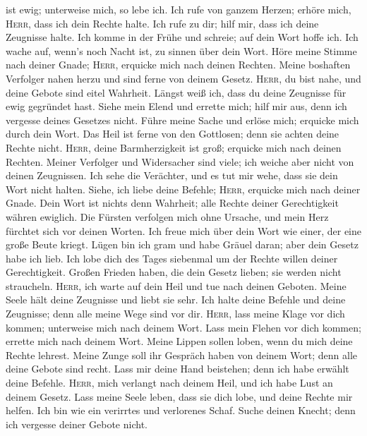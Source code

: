 ist ewig; unterweise mich, so lebe ich.  Ich rufe von
ganzem Herzen; erhöre mich, \textsc{Herr}, dass ich dein Rechte halte.
 Ich rufe zu dir; hilf mir, dass ich deine Zeugnisse
halte.  Ich komme in der Frühe und schreie; auf dein
Wort hoffe ich.  Ich wache auf, wenn's noch Nacht ist,
zu sinnen über dein Wort.  Höre meine Stimme nach deiner
Gnade; \textsc{Herr}, erquicke mich nach deinen Rechten.
 Meine boshaften Verfolger nahen herzu und sind ferne
von deinem Gesetz.  \textsc{Herr}, du bist nahe, und
deine Gebote sind eitel Wahrheit.  Längst weiß ich, dass
du deine Zeugnisse für ewig gegründet hast.  Siehe mein
Elend und errette mich; hilf mir aus, denn ich vergesse deines Gesetzes
nicht.  Führe meine Sache und erlöse mich; erquicke mich
durch dein Wort.  Das Heil ist ferne von den Gottlosen;
denn sie achten deine Rechte nicht.  \textsc{Herr},
deine Barmherzigkeit ist groß; erquicke mich nach deinen Rechten.
 Meiner Verfolger und Widersacher sind viele; ich weiche
aber nicht von deinen Zeugnissen.  Ich sehe die
Verächter, und es tut mir wehe, dass sie dein Wort nicht halten.
 Siehe, ich liebe deine Befehle; \textsc{Herr}, erquicke
mich nach deiner Gnade.  Dein Wort ist nichts denn
Wahrheit; alle Rechte deiner Gerechtigkeit währen ewiglich.
 Die Fürsten verfolgen mich ohne Ursache, und mein Herz
fürchtet sich vor deinen Worten.  Ich freue mich über
dein Wort wie einer, der eine große Beute kriegt.  Lügen
bin ich gram und habe Gräuel daran; aber dein Gesetz habe ich lieb.
 Ich lobe dich des Tages siebenmal um der Rechte willen
deiner Gerechtigkeit.  Großen Frieden haben, die dein
Gesetz lieben; sie werden nicht straucheln. 
\textsc{Herr}, ich warte auf dein Heil und tue nach deinen Geboten.
 Meine Seele hält deine Zeugnisse und liebt sie sehr.
 Ich halte deine Befehle und deine Zeugnisse; denn alle
meine Wege sind vor dir.  \textsc{Herr}, lass meine
Klage vor dich kommen; unterweise mich nach deinem Wort.
 Lass mein Flehen vor dich kommen; errette mich nach
deinem Wort.  Meine Lippen sollen loben, wenn du mich
deine Rechte lehrest.  Meine Zunge soll ihr Gespräch
haben von deinem Wort; denn alle deine Gebote sind recht.
 Lass mir deine Hand beistehen; denn ich habe erwählt
deine Befehle.  \textsc{Herr}, mich verlangt nach deinem
Heil, und ich habe Lust an deinem Gesetz.  Lass meine
Seele leben, dass sie dich lobe, und deine Rechte mir helfen.
 Ich bin wie ein verirrtes und verlorenes Schaf. Suche
deinen Knecht; denn ich vergesse deiner Gebote nicht.

